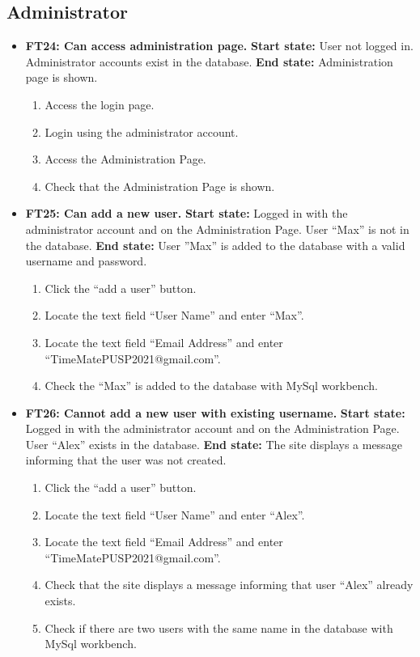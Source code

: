 \documentclass{article}
\begin{document}
\subsection{Administrator}
\begin{itemize}
		\item \textbf{FT24: Can access administration page.} \newline
		\textbf{Start state:} User not logged in. Administrator accounts exist in the database.
 \newline
		\textbf{End state:} Administration page is shown.
		\begin{enumerate}
			\item Access the login page.
			\item Login using the administrator account.
			\item Access the Administration Page.
			\item Check that the Administration Page is shown.
		\end{enumerate}
		
		\item \textbf{FT25: Can add a new user.} \newline
		\textbf{Start state:} Logged in with the administrator account and on the Administration Page. User “Max” is not in the database. \newline
		\textbf{End state:} User ”Max” is added to the database with a valid username and password.
		\begin{enumerate}
			\item Click the “add a user” button.
			\item Locate the text field “User Name” and enter “Max”.
			\item Locate the text field “Email Address” and enter “TimeMatePUSP2021@gmail.com”.
			\item Check the “Max” is added to the database with MySql workbench.
		\end{enumerate}
		
		
		\item \textbf{FT26: Cannot add a new user with existing username.} \newline
		\textbf{Start state:}  Logged in with the administrator account and on the Administration Page. User “Alex” exists in the database.\newline
		\textbf{End state:} The site displays a message informing that the user was not created.
		\begin{enumerate}
			\item Click the “add a user” button.
			\item Locate the text field “User Name” and enter “Alex”.
			\item Locate the text field “Email Address” and enter “TimeMatePUSP2021@gmail.com”.
			\item Check that the site displays a message informing that user “Alex” already exists.
			\item Check if there are two users with the same name in the database with MySql workbench.
		\end{enumerate}
		

\end{itemize}
\end{document}
